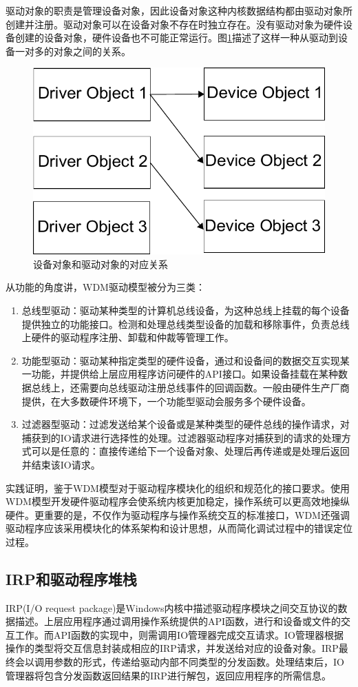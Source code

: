 驱动对象的职责是管理设备对象，因此设备对象这种内核数据结构都由驱动对象所创建并注册。驱动对象可以在设备对象不存在时独立存在。没有驱动对象为硬件设备创建的设备对象，硬件设备也不可能正常运行。图\ref{fig:drv-to-dev}描述了这样一种从驱动到设备一对多的对象之间的关系。
\begin{figure}[H]
\centering
\includegraphics[width=0.6\linewidth]{./graph/drv-to-dev}
\caption{设备对象和驱动对象的对应关系}
\label{fig:drv-to-dev}
\end{figure}

从功能的角度讲，WDM驱动模型被分为三类：
\begin{enumerate}
\item
总线型驱动：驱动某种类型的计算机总线设备，为这种总线上挂载的每个设备提供独立的功能接口。检测和处理总线类型设备的加载和移除事件，负责总线上硬件的驱动程序注册、卸载和仲裁等管理工作。
\item
功能型驱动：驱动某种指定类型的硬件设备，通过和设备间的数据交互实现某一功能，并提供给上层应用程序访问硬件的API接口。如果设备挂载在某种数据总线上，还需要向总线驱动注册总线事件的回调函数。一般由硬件生产厂商提供，在大多数硬件环境下，一个功能型驱动会服务多个硬件设备。
\item
过滤器型驱动：过滤发送给某个设备或是某种类型的硬件总线的操作请求，对捕获到的IO请求进行选择性的处理。过滤器驱动程序对捕获到的请求的处理方式可以是任意的：直接传递给下一个设备对象、处理后再传递或是处理后返回并结束该IO请求。
\end{enumerate}

实践证明，鉴于WDM模型对于驱动程序模块化的组织和规范化的接口要求。使用WDM模型开发硬件驱动程序会使系统内核更加稳定，操作系统可以更高效地操纵硬件。更重要的是，不仅作为驱动程序与操作系统交互的标准接口，WDM还强调驱动程序应该采用模块化的体系架构和设计思想，从而简化调试过程中的错误定位过程。

\subsection{IRP和驱动程序堆栈}
IRP(I/O request package)是Windows内核中描述驱动程序模块之间交互协议的数据描述。上层应用程序通过调用操作系统提供的API函数，进行和设备或文件的交互工作。而API函数的实现中，则需调用IO管理器完成交互请求。IO管理器根据操作的类型将交互信息封装成相应的IRP请求，并发送给对应的设备对象。IRP最终会以调用参数的形式，传递给驱动内部不同类型的分发函数。处理结束后，IO管理器将包含分发函数返回结果的IRP进行解包，返回应用程序的所需信息。

